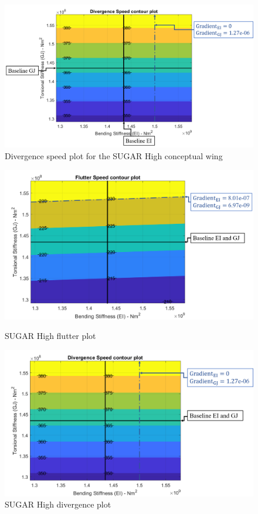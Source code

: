 \documentclass[11pt]{article}
\begin{document}
\begin{figure}[H]
    \centering
    \includegraphics[width = \textwidth]{figures/SUGAR_div.png}
    \caption{Divergence speed plot for the SUGAR High conceptual wing}
    \label{fig:SUGAR-div}
\end{figure}
\fi
\vspace{-.5cm}
\begin{figure}[!hbt]
    \begin{minipage}{.5\textwidth}
    \centering
    \includegraphics[width = \textwidth]{figures/flutter.png}
    \caption{SUGAR High flutter plot}
    \label{fig:SUGAR-flutt}
    \end{minipage}%
    \begin{minipage}{.5\textwidth}
    \centering
    \includegraphics[width = \textwidth]{figures/divergence.png}
    \caption{SUGAR High divergence plot}
    \label{fig:SUGAR-div}
    \end{minipage}
\end{figure}
\end{document}
